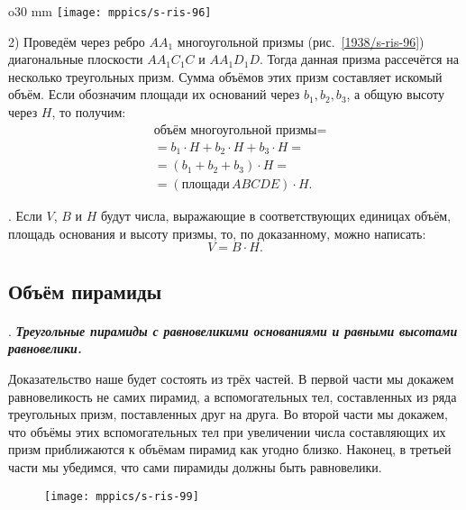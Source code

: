 \begin{wrapfigure}[12]{o}{30 mm}
\vskip0mm
\centering
\texttt{[image: mppics/s-ris-96]}
\caption{}\label{1938/s-ris-96}
\vskip-0mm
\end{wrapfigure}

2) Проведём через ребро $AA_1$ многоугольной призмы (рис.~\ref{1938/s-ris-96}) диагональные плоскости $AA_1C_1C$ и $AA_1D_1D$.
Тогда данная призма рассечётся на несколько треугольных призм.
Сумма объёмов этих призм составляет искомый объём.
Если обозначим площади их оснований через $b_1,b_2,b_3$, а общую высоту через $H$, то получим: 
\begin{align*}
&\text{объём многоугольной призмы}=
\\
&= b_1\cdot H + b_2 \cdot H+ b_3\cdot H=
\\
&=(b_1+ b_2+b_3)\cdot H = 
\\
&=(\text{площади}\, ABCDE)\cdot H.
\end{align*}

\mbox{.}
Если $V$, $B$ и $H$ будут числа, выражающие в соответствующих единицах объём, площадь основания и высоту призмы, то, по доказанному, можно написать:
\[V = B\cdot H.\]



\subsection*{Объём пирамиды}

\paragraph{}\label{1938/s90}
.
\textbf{\emph{Треугольные пирамиды с равновеликими основаниями и равными высотами равновелики.}}

Доказательство наше будет состоять из трёх частей.
В первой части мы докажем равновеликость не самих пирамид, а вспомогательных тел, составленных из ряда треугольных призм, поставленных друг на друга.
Во второй части мы докажем, что объёмы этих вспомогательных тел при увеличении числа составляющих их призм приближаются к объёмам пирамид как угодно близко.
Наконец, в третьей части мы убедимся, что сами пирамиды должны быть равновелики.

\begin{figure}[h!]
\vskip-0mm
\centering
\texttt{[image: mppics/s-ris-99]}
\caption{}\label{1938/s-ris-99}
\vskip-0mm
\end{figure}

